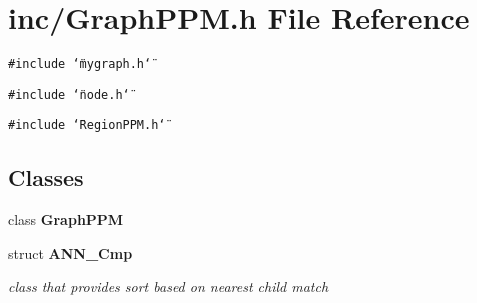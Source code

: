 \section{inc/GraphPPM.h File Reference}
\label{GraphPPM_8h}
{\tt \#include \char`\"{}mygraph.h\char`\"{}}\par
{\tt \#include \char`\"{}node.h\char`\"{}}\par
{\tt \#include \char`\"{}RegionPPM.h\char`\"{}}\par
\subsection*{Classes}
\begin{CompactItemize}
\item 
class {\bf GraphPPM}
\item 
struct {\bf ANN\_\-Cmp}
\begin{CompactList}\small\item\em class that provides sort based on nearest child match \item\end{CompactList}\end{CompactItemize}
